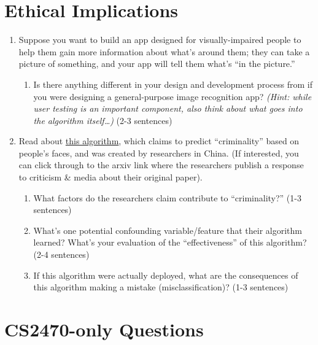 \documentclass{article}
\begin{document}
\section{Ethical Implications}
\begin{enumerate}

\item 
Suppose you want to build an app designed for visually-impaired people to help them gain more information about what’s around them; they can take a picture of something, and your app will tell them what’s “in the picture.” 
\begin{enumerate}
\item
Is there anything different in your design and development process from if you were designing a general-purpose image recognition app? \emph{(Hint: while user testing is an important component, also think about what goes into the algorithm itself…)} (2-3 sentences)

\end{enumerate}

\item
Read about \href{https://www.technologyreview.com/s/602955/neural-network-learns-to-identify-criminals-by-their-faces/}{this algorithm}, which claims to predict “criminality” based on people’s faces, and was created by researchers in China. (If interested, you can click through to the arxiv link where the researchers publish a response to criticism \& media about their original paper).
\begin{enumerate}
    \item 
    What factors do the researchers claim contribute to “criminality?” (1-3 sentences)

    \item 
    What’s one potential confounding variable/feature that their algorithm learned? What’s your evaluation of the “effectiveness” of this algorithm? (2-4 sentences)
    
    \item
    If this algorithm were actually deployed, what are the consequences of this algorithm making a mistake (misclassification)? (1-3 sentences)
\end{enumerate}

\end{enumerate}


\section{CS2470-only Questions}
\end{document}
